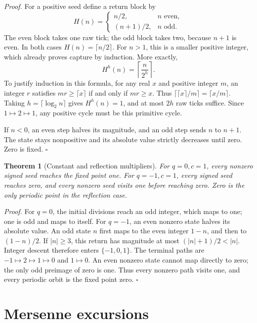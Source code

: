 \documentclass[11pt,letterpaper]{article}
\newtheorem{theorem}{Theorem}
\newenvironment{proof}{\noindent\textit{Proof.}}{\hfill\(\square\)}
\begin{document}
\begin{proof}
For a positive seed define a return block by
\[
H(n)=\begin{cases}n/2,&n\text{ even},\\(n+1)/2,&n\text{ odd}.
\end{cases}
\]
The even block takes one raw tick; the odd block takes two, because
\(n+1\) is even. In both cases \(H(n)=\lceil n/2\rceil\).
For \(n>1\), this is a smaller positive integer, which already proves
capture by induction. More exactly,
\[
H^h(n)=\left\lceil\frac{n}{2^h}\right\rceil.
\]
To justify induction in this formula, for any real \(x\) and positive
integer \(m\), an integer \(r\) satisfies
\(mr\ge\lceil x\rceil\) if and only if \(mr\ge x\).
Thus \(\lceil\lceil x\rceil/m\rceil=\lceil x/m\rceil\).
Taking \(h=\lceil\log_2 n\rceil\) gives \(H^h(n)=1\), and at most
\(2h\) raw ticks suffice. Since \(1\mapsto2\mapsto1\), any positive
cycle must be this primitive cycle.

If \(n<0\), an even step halves its magnitude, and an odd step sends
\(n\) to \(n+1\). The state stays nonpositive and its absolute value
strictly decreases until zero. Zero is fixed.
\end{proof}

\begin{theorem}[Constant and reflection multipliers]
For \(q=0,c=1\), every nonzero signed seed reaches the fixed point one.
For \(q=-1,c=1\), every signed seed reaches zero, and every nonzero
seed visits one before reaching zero. Zero is the only periodic point
in the reflection case.
\end{theorem}

\begin{proof}
For \(q=0\), the initial divisions reach an odd integer, which maps to
one; one is odd and maps to itself.
For \(q=-1\), an even nonzero state halves its absolute value. An odd
state \(n\) first maps to the even integer \(1-n\), and then to
\((1-n)/2\). If \(|n|\ge3\), this return has magnitude at most
\((|n|+1)/2<|n|\). Integer descent therefore enters \(\{-1,0,1\}\).
The terminal paths are \(-1\mapsto2\mapsto1\mapsto0\) and
\(1\mapsto0\). An even nonzero state cannot map directly to zero;
the only odd preimage of zero is one. Thus every nonzero path visits
one, and every periodic orbit is the fixed point zero.
\end{proof}

\section{Mersenne excursions}
\end{document}

